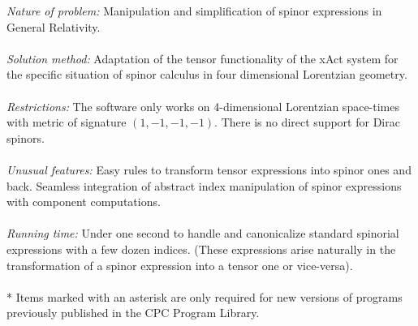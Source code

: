 \documentclass[final,3p,times,twocolumn]{elsarticle}
\begin{document}
\begin{small}
{\em Nature of problem:} Manipulation and simplification of spinor expressions in 
General Relativity.\\
   \\
{\em Solution method:} Adaptation of the tensor functionality of the xAct system for the specific situation of spinor calculus in four dimensional Lorentzian geometry.\\
   \\
{\em Restrictions:} The software only works on 4-dimensional Lorentzian space-times with 
metric of signature $(1,-1,-1,-1)$. There is no direct support for Dirac spinors.\\
   \\
{\em Unusual features:} Easy rules to transform tensor expressions into spinor ones and back.
Seamless integration of abstract index manipulation of spinor expressions with component computations. \\
   \\
 {\em Running time:} Under one second to handle and canonicalize standard spinorial expressions with a few dozen indices. (These expressions arise naturally in the transformation of a spinor expression into a tensor one or vice-versa).\\
   \\
* Items marked with an asterisk are only required for new versions
of programs previously published in the CPC Program Library.\\
\end{small}
\end{document}
